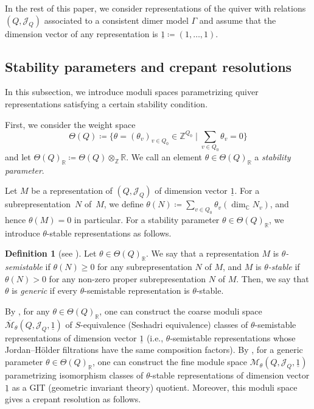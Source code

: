 \documentclass[pdftex]{sigma}
\numberwithin{equation}{section}
\theoremstyle{definition}
\newtheorem{Definition}[Theorem]{Definition}
\newcommand{\ZZ}{\mathbb{Z}}
\newcommand{\RR}{\mathbb{R}}
\newcommand{\CC}{\mathbb{C}}
\newcommand{\calJ}{\mathcal{J}}
\newcommand{\calM}{\mathcal{M}}
\newcommand{\barone}{\underline{1}}
\begin{document}
In the rest of this paper, we consider representations of the quiver with relations $(Q,\calJ_Q)$ associated to a consistent dimer model $\Gamma$
and assume that the dimension vector of any representation is $\barone\coloneqq(1,\dots,1)$.

\subsection{Stability parameters and crepant resolutions}\label{subsec_crepant_resolution}

In this subsection, we introduce moduli spaces parametrizing quiver representations satisfying a certain stability condition.

First, we consider the weight space
\[
\Theta(Q)\coloneqq\biggl\{\theta=(\theta_v)_{v\in Q_0}\in\ZZ^{Q_0} \mid \sum_{v\in Q_0}\theta_v=0\biggr\}
\]
and let $\Theta(Q)_\RR\coloneqq\Theta(Q)\otimes_\ZZ\RR$.
We call an element $\theta\in\Theta(Q)_\RR$ a \emph{stability parameter}.

Let $M$ be a representation of $(Q,\calJ_Q)$ of dimension vector $\barone$.
For a subrepresentation~$N$ of~$M$, we define $\theta(N)\coloneqq\sum_{v\in Q_0}\theta_v(\dim_\CC N_v)$, and hence $\theta(M)=0$ in particular.
For a stability parameter $\theta\in\Theta(Q)_\RR$, we introduce $\theta$-stable representations as follows.

\begin{Definition}[{see \cite{King_moduli}}]
Let $\theta\in\Theta(Q)_\RR$.
We say that a representation $M$ is \emph{$\theta$-semistable} if $\theta(N)\ge0$ for any subrepresentation $N$ of $M$, and
$M$ is \emph{$\theta$-stable} if $\theta(N)>0$ for any non-zero proper subrepresentation $N$ of $M$.
Then, we say that $\theta$ is \emph{generic} if every $\theta$-semistable representation is $\theta$-stable.
\end{Definition}

By \cite[Proposition~5.2]{King_moduli}, for any $\theta\in\Theta(Q)_\RR$, one can construct the coarse moduli space $\overline{\calM}_\theta(Q,\calJ_Q, \barone)$ of $S$-equivalence (Seshadri equivalence) classes of $\theta$-semistable representations of dimension vector $\barone$
(i.e., $\theta$-semistable representations whose Jordan--H\"{o}lder filtrations have the same composition factors).
By \cite[Proposition~5.3]{King_moduli}, for a generic parameter $\theta\in\Theta(Q)_\RR$,
one can construct the fine module space $\calM_\theta(Q,\calJ_Q, \barone)$ parametrizing isomorphism classes of $\theta$-stable representations of dimension vector $\barone$ as a GIT (geometric invariant theory) quotient.
Moreover, this moduli space gives a crepant resolution as follows.
\end{document}
